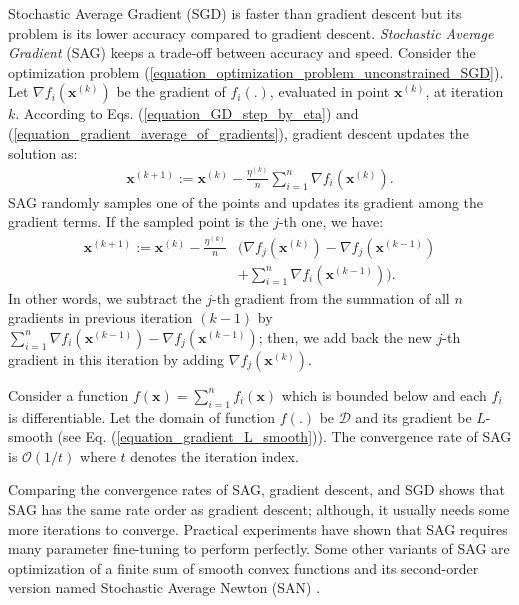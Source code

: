 \documentclass[lang=cn,10pt]{gorgeousnbook}
\numberwithin{equation}{section}%
\numberwithin{figure}{section}%
\begin{document}
Stochastic Average Gradient (SGD) is faster than gradient descent but its problem is its lower accuracy compared to gradient descent. \textit{Stochastic Average Gradient} (SAG) \cite{roux2012stochastic} keeps a trade-off between accuracy and speed. 
Consider the optimization problem (\ref{equation_optimization_problem_unconstrained_SGD}). 
Let $\nabla f_{i}(\boldsymbol{x}^{(k)})$ be the gradient of $f_i(.)$, evaluated in point $\boldsymbol{x}^{(k)}$, at iteration $k$. 
According to Eqs. (\ref{equation_GD_step_by_eta}) and (\ref{equation_gradient_average_of_gradients}), gradient descent updates the solution as:
\begin{align*}
\boldsymbol{x}^{(k+1)} := \boldsymbol{x}^{(k)} - \frac{\eta^{(k)}}{n} \sum_{i=1}^n \nabla f_{i}(\boldsymbol{x}^{(k)}).
\end{align*}
SAG randomly samples one of the points and updates its gradient among the gradient terms. If the sampled point is the $j$-th one, we have:
\begin{equation}\label{equation_update_SAG}
\begin{aligned}
\boldsymbol{x}^{(k+1)} := \boldsymbol{x}^{(k)} - \frac{\eta^{(k)}}{n} &\Big( \nabla f_{j}(\boldsymbol{x}^{(k)}) - \nabla f_{j}(\boldsymbol{x}^{(k-1)}) \\
&+ \sum_{i=1}^n \nabla f_{i}(\boldsymbol{x}^{(k-1)}) \Big).
\end{aligned}
\end{equation}
In other words, we subtract the $j$-th gradient from the summation of all $n$ gradients in previous iteration $(k-1)$ by $\sum_{i=1}^n \nabla f_{i}(\boldsymbol{x}^{(k-1)}) - \nabla f_{j}(\boldsymbol{x}^{(k-1)})$; then, we add back the new $j$-th gradient in this iteration by adding $\nabla f_{j}(\boldsymbol{x}^{(k)})$. 

\begin{theorem}
Consider a function $f(\boldsymbol{x}) = \sum_{i=1}^n f_i(\boldsymbol{x})$ which is bounded below and each $f_i$ is differentiable. Let the domain of function $f(.)$ be $\mathcal{D}$ and its gradient be $L$-smooth (see Eq. (\ref{equation_gradient_L_smooth})). 
The convergence rate of SAG is $\mathcal{O}(1/t)$ where $t$ denotes the iteration index. 
\end{theorem}
Comparing the convergence rates of SAG, gradient descent, and SGD shows that SAG has the same rate order as gradient descent; although, it usually needs some more iterations to converge. 
Practical experiments have shown that SAG requires many parameter fine-tuning to perform perfectly. 
Some other variants of SAG are optimization of a finite sum of smooth convex functions \cite{schmidt2017minimizing} and its second-order version named Stochastic Average Newton (SAN) \cite{chen2021san}.
\end{document}
